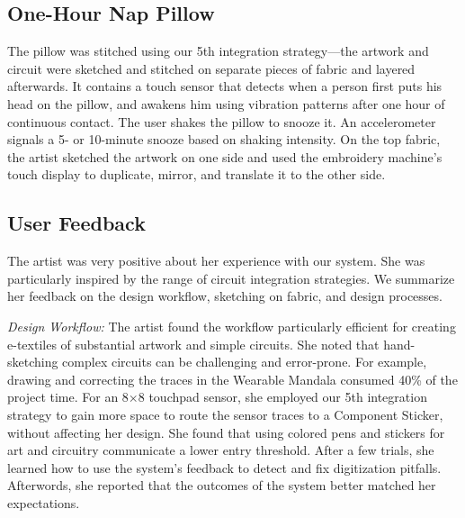 \documentclass[header.tex]{subfiles}
\begin{document}
\subsection{One-Hour Nap Pillow}
The pillow was stitched using our 5th integration strategy---the artwork and circuit were sketched and stitched on separate pieces of fabric and layered afterwards. It contains a touch sensor that detects when a person first puts his head on the pillow, and awakens him using vibration patterns after one hour of continuous contact. The user shakes the pillow to snooze it. An accelerometer signals a 5- or 10-minute snooze based on shaking intensity. On the top fabric, the artist sketched the artwork on one side and used the embroidery machine's touch display to duplicate, mirror, and translate it to the other side. 


\subsection{User Feedback}
The artist was very positive about her experience with our system. She was particularly inspired by the range of circuit integration strategies. We summarize her feedback on the design workflow, sketching on fabric, and design processes. 


\textit{Design Workflow:} The artist found the workflow particularly efficient for creating e-textiles of substantial artwork and simple circuits. She noted that hand-sketching complex circuits can be challenging and error-prone. For example, drawing and correcting the traces in the Wearable Mandala consumed 40\% of the project time. For an 8$\times$8 touchpad sensor, she employed our 5th integration strategy to gain more space to route the sensor traces to a Component Sticker, without affecting her design. She found that using colored pens and stickers for art and circuitry communicate a lower entry threshold. %
After a few trials, she learned how to use the system's feedback to detect and fix digitization pitfalls. Afterwords, she reported that the outcomes of the system better matched her expectations.
\end{document}
